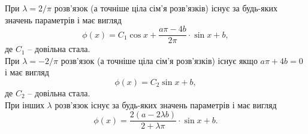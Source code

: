 \begin{solution}
        При $\lambda = 2 / \pi$ розв'язок (а точніше ціла сім'я розв'язків) існує за будь-яких значень параметрів і має вигляд 
        \[ \phi(x) = C_1 \cos x + \dfrac{a \pi - 4b}{2\pi} \cdot \sin x + b, \]
        де $C_1$ -- довільна стала. \\
        
        При $\lambda = - 2 / \pi$ розв'язок (а точніше ціла сім'я розв'язків) існує якщо $a\pi + 4b = 0$ і має вигляд 
        \[ \phi(x) = C_2 \sin x + b, \]
        де $C_2$ -- довільна стала. \\
        
        При інших $\lambda$ розв'язок існує за будь-яких значень параметрів і має вигляд 
        \[ \phi(x) = \dfrac{2(a - 2\lambda b)}{2 + \lambda \pi} \cdot \sin x + b. \]
\end{solution}
